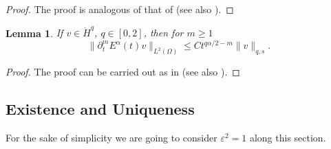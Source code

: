 \documentclass{amsart}
\newcommand{\ele}{L^2(\Omega)}
\newcommand{\W}{\Omega}
\newcommand{\eps}{\varepsilon}
\newtheorem{lemma}[theorem]{Lemma}
\theoremstyle{remark}
\theoremstyle{definition}
\numberwithin{equation}{section}
\begin{document}
\begin{proof} The proof is analogous of that of  \cite[Lemma 2.2]{BLPZ} (see also \cite[Lemma 2.0.2]{tesis_yo}).  \end{proof}


\begin{lemma}\label{lem:derivada_operador}
If $v\in \dot{H}^ q$, $q\in[0,2]$, then for $m\geq1$
  \begin{equation*}
   \| \partial_t^m E^{\alpha}(t) v \|_{L^2(\W)} \le C t^{q\alpha/2-m}  \| v \|_{q,s}.
  \end{equation*}
\end{lemma}
\begin{proof} The proof can be carried out as in \cite[Theorem A.2]{Jin} (see also \cite[Lemma 2.0.3]{tesis_yo}). \end{proof}
 


\subsection{ Existence and Uniqueness}

For the sake of simplicity we are going to consider $\eps^2=1$ along this section.
\end{document}
